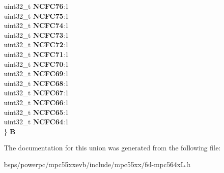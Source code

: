 \begin{DoxyCompactItemize}
\begin{tabbing}
\>uint32\_t {\bfseries NCFC76}:1\\
\>uint32\_t {\bfseries NCFC75}:1\\
\>uint32\_t {\bfseries NCFC74}:1\\
\>uint32\_t {\bfseries NCFC73}:1\\
\>uint32\_t {\bfseries NCFC72}:1\\
\>uint32\_t {\bfseries NCFC71}:1\\
\>uint32\_t {\bfseries NCFC70}:1\\
\>uint32\_t {\bfseries NCFC69}:1\\
\>uint32\_t {\bfseries NCFC68}:1\\
\>uint32\_t {\bfseries NCFC67}:1\\
\>uint32\_t {\bfseries NCFC66}:1\\
\>uint32\_t {\bfseries NCFC65}:1\\
\>uint32\_t {\bfseries NCFC64}:1\\
\} {\bfseries B}\\

\end{tabbing}\end{DoxyCompactItemize}


The documentation for this union was generated from the following file\+:\begin{DoxyCompactItemize}
\item 
bsps/powerpc/mpc55xxevb/include/mpc55xx/fsl-\/mpc564x\+L.\+h\end{DoxyCompactItemize}
